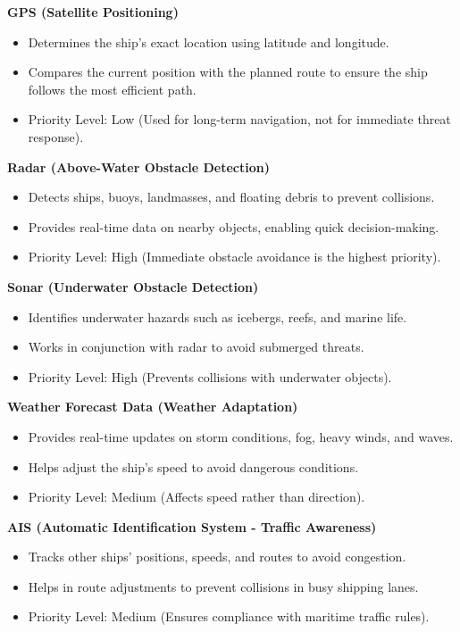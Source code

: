 \documentclass{article}
\begin{document}
\textbf{GPS (Satellite Positioning)}
\begin{itemize}
    \item Determines the ship’s exact location using latitude and longitude.
    \item Compares the current position with the planned route to ensure the ship follows the most efficient path.
    \item Priority Level: Low (Used for long-term navigation, not for immediate threat response).
\end{itemize}

\textbf{Radar (Above-Water Obstacle Detection)}
\begin{itemize}
    \item Detects ships, buoys, landmasses, and floating debris to prevent collisions.
    \item Provides real-time data on nearby objects, enabling quick decision-making.
    \item Priority Level: High (Immediate obstacle avoidance is the highest priority).
\end{itemize}

\textbf{Sonar (Underwater Obstacle Detection)}
\begin{itemize}
    \item Identifies underwater hazards such as icebergs, reefs, and marine life.
    \item Works in conjunction with radar to avoid submerged threats.
    \item Priority Level: High (Prevents collisions with underwater objects).
\end{itemize}

\textbf{Weather Forecast Data (Weather Adaptation)}
\begin{itemize}
    \item Provides real-time updates on storm conditions, fog, heavy winds, and waves.
    \item Helps adjust the ship’s speed to avoid dangerous conditions.
    \item Priority Level: Medium (Affects speed rather than direction).
\end{itemize}

\textbf{AIS (Automatic Identification System - Traffic Awareness)}
\begin{itemize}
    \item Tracks other ships’ positions, speeds, and routes to avoid congestion.
    \item Helps in route adjustments to prevent collisions in busy shipping lanes.
    \item Priority Level: Medium (Ensures compliance with maritime traffic rules).
\end{itemize}
\end{document}
